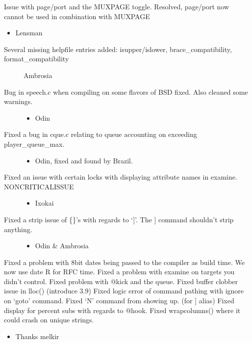 \documentclass[letterpaper,10pt,english]{sphinxmanual}
\begin{document}
\sphinxAtStartPar
Issue with page/port and the MUXPAGE toggle. Resolved, page/port now cannot be
used in combination with MUXPAGE
\begin{itemize}
\item {} 
\sphinxAtStartPar
Lensman

\end{itemize}
\begin{description}
\item[{Several missing helpfile entries added: isupper/islower, brace\_compatibility, format\_compatibility}] \leavevmode
\sphinxAtStartPar
\sphinxhyphen{}Ambrosia

\item[{Bug in speech.c when compiling on some flavors of BSD fixed. Also cleaned some warnings.}] \leavevmode\begin{itemize}
\item {} 
\sphinxAtStartPar
Odin

\end{itemize}

\item[{Fixed a bug in cque.c relating to queue accounting on exceeding player\_queue\_max.}] \leavevmode\begin{itemize}
\item {} 
\sphinxAtStartPar
Odin, fixed and found by Brazil.

\end{itemize}

\item[{Fixed an issue with certain locks with displaying attribute names in examine. NON\sphinxhyphen{}CRITICAL\sphinxhyphen{}ISSUE}] \leavevmode\begin{itemize}
\item {} 
\sphinxAtStartPar
Ixokai

\end{itemize}

\item[{Fixed a strip issue of \{\}’s with regards to ‘{]}’.  The {]} command shouldn’t strip anything.}] \leavevmode\begin{itemize}
\item {} 
\sphinxAtStartPar
Odin \& Ambrosia

\end{itemize}

\end{description}

\sphinxAtStartPar
Fixed a problem with 8\sphinxhyphen{}bit dates being passed to the compiler as build time. We now use date \sphinxhyphen{}R for RFC time.
Fixed a problem with examine on targets you didn’t control.
Fixed problem with @kick and the queue.
Fixed buffer clobber issue in lloc() (introduce 3.9)
Fixed logic error of command pathing with ignore on ‘goto’ command.
Fixed ‘N’ command from showing up. (for {]} alias)
Fixed display for percent subs with regards to @hook.
Fixed wrapcolumns() where it could crash on unique strings.
\begin{itemize}
\item {} 
\sphinxAtStartPar
Thanks melkir

\end{itemize}
\end{document}
